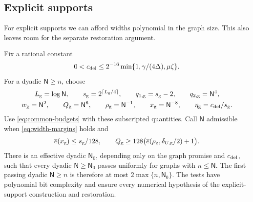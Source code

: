 \documentclass[11pt]{article} \usepackage[utf8]{inputenc}
\theoremstyle{plain} \newtheorem{theorem}{Theorem}[section]
\theoremstyle{definition} \newaliascnt{definition}{theorem}
\newcommand{\ceil}[1]{\left\lceil#1\right\rceil}
\begin{document}
\subsection{Explicit supports}

For explicit supports we can afford widths polynomial in the graph size.
This also leaves room for the separate restoration argument.

\begin{lemma}\label{lem:generated-schedule}
Fix a rational constant
\[
0<c_{\rm del}\le2^{-16}\min\{1,\gamma/(4\Delta),\mu\zeta\}.
\]
For a dyadic $\mathsf N\ge n$, choose
\[
\begin{gathered}
L_{\rm g}=\log\mathsf N,\qquad
s_{\rm g}=2^{\ceil{L_{\rm g}/4}},\qquad q_{1,\rm g}=s_{\rm g}-2,\qquad
q_{2,\rm g}=\mathsf N^4,\\
w_{\rm g}=\mathsf N^2,\qquad Q_{\rm g}=\mathsf N^6,\qquad
\rho_{\rm g}=\mathsf N^{-1},\qquad x_{\rm g}=\mathsf N^{-8},\qquad
\eta_{\rm g}=c_{\rm del}/s_{\rm g}.
\end{gathered}
\]
Use \eqref{eq:common-budgets} with these subscripted quantities. Call
$\mathsf N$ admissible when \eqref{eq:width-margins} holds and
\[
\overline e(x_{\rm g})\le s_{\rm g}/128,\qquad
Q_{\rm g}\ge128\bigl(\overline e(\rho_{\rm g},\delta_{U,\rm g}/2)+1\bigr).
\]
There is an effective dyadic $\mathsf N_0$, depending only on the graph
promise and $c_{\rm del}$, such that every dyadic $\mathsf N\ge\mathsf N_0$
passes uniformly for graphs with $n\le\mathsf N$. The first passing dyadic
$\mathsf N\ge n$ is therefore at most $2\max\{n,\mathsf N_0\}$.
The tests have polynomial bit complexity and ensure every numerical
hypothesis of the explicit-support construction and restoration.
\end{lemma}
\end{document}
